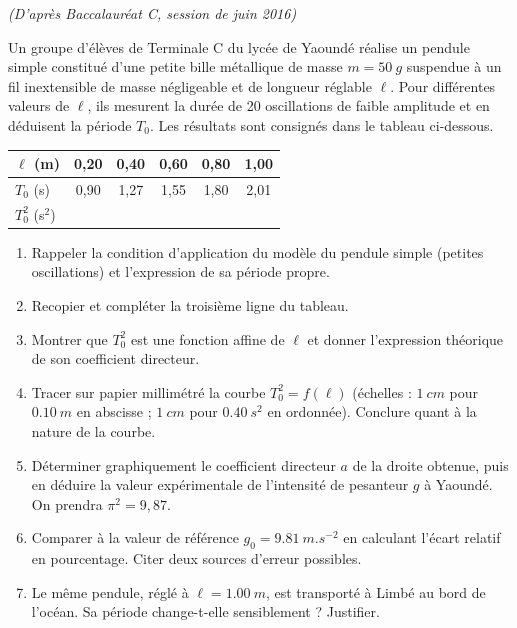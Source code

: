 \documentclass[11pt]{article}
\begin{document}
\begin{exercice}
\textit{(D'après Baccalauréat C, session de juin 2016)}

Un groupe d'élèves de Terminale C du lycée de Yaoundé réalise un pendule simple constitué d'une petite bille métallique de masse $m = \SI{50}{g}$ suspendue à un fil inextensible de masse négligeable et de longueur réglable $\ell$. Pour différentes valeurs de $\ell$, ils mesurent la durée de 20 oscillations de faible amplitude et en déduisent la période $T_0$. Les résultats sont consignés dans le tableau ci-dessous.

\begin{center}
\begin{tabular}{|l|*{5}{c|}}
\hline
$\ell$ (m) & 0,20 & 0,40 & 0,60 & 0,80 & 1,00 \\
\hline
$T_0$ (s) & 0,90 & 1,27 & 1,55 & 1,80 & 2,01 \\
\hline
$T_0^2$ (s$^2$) & & & & & \\
\hline
\end{tabular}
\end{center}

\begin{enumerate}
\item Rappeler la condition d'application du modèle du pendule simple (petites oscillations) et l'expression de sa période propre.
\item Recopier et compléter la troisième ligne du tableau.
\item Montrer que $T_0^2$ est une fonction affine de $\ell$ et donner l'expression théorique de son coefficient directeur.
\item Tracer sur papier millimétré la courbe $T_0^2 = f(\ell)$ (échelles : $\SI{1}{cm}$ pour $\SI{0,10}{m}$ en abscisse ; $\SI{1}{cm}$ pour $\SI{0,40}{s^2}$ en ordonnée). Conclure quant à la nature de la courbe.
\item Déterminer graphiquement le coefficient directeur $a$ de la droite obtenue, puis en déduire la valeur expérimentale de l'intensité de pesanteur $g$ à Yaoundé. On prendra $\pi^2 = 9,87$.
\item Comparer à la valeur de référence $g_0 = \SI{9,81}{m.s^{-2}}$ en calculant l'écart relatif en pourcentage. Citer deux sources d'erreur possibles.
\item Le même pendule, réglé à $\ell = \SI{1,00}{m}$, est transporté à Limbé au bord de l'océan. Sa période change-t-elle sensiblement ? Justifier.
\end{enumerate}
\end{exercice}
\end{document}
